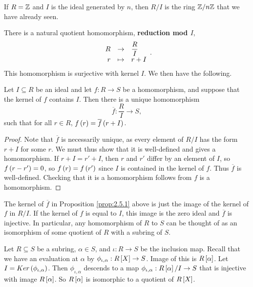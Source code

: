 \begin{example*}
If $ R = \Z $ and $ I $ is the ideal generated by $ n $, then $ R / I $ is the ring $ \Z / n\Z $ that we have already seen.
\end{example*}

There is a natural quotient homomorphism, \textbf{reduction mod $ I $},
$$ \function{R}{\dfrac{R}{I}}{r}{r + I}. $$
This homomorphism is surjective with kernel $ I $. We then have the following.

\begin{proposition}
\label{prop:2.5.1}
Let $ I \subseteq R $ be an ideal and let $ f : R \to S $ be a homomorphism, and suppose that the kernel of $ f $ contains $ I $. Then there is a unique homomorphism
$$ \overline{f} : \dfrac{R}{I} \to S, $$
such that for all $ r \in R $, $ f\rb{r} = \overline{f}\rb{r + I} $.
\end{proposition}

\begin{proof}
Note that $ \overline{f} $ is necessarily unique, as every element of $ R / I $ has the form $ r + I $ for some $ r $. We must thus show that it is well-defined and gives a homomorphism. If $ r + I = r' + I $, then $ r $ and $ r' $ differ by an element of $ I $, so $ f\rb{r - r'} = 0 $, so $ f\rb{r} = f\rb{r'} $ since $ I $ is contained in the kernel of $ f $. Thus $ \overline{f} $ is well-defined. Checking that it is a homomorphism follows from $ f $ is a homomorphism.
\end{proof}

\begin{note*}
The kernel of $ \overline{f} $ in Proposition \ref{prop:2.5.1} above is just the image of the kernel of $ f $ in $ R / I $. If the kernel of $ f $ is equal to $ I $, this image is the zero ideal and $ \overline{f} $ is injective. In particular, any homomorphism of $ R $ to $ S $ can be thought of as an isomorphism of some quotient of $ R $ with a subring of $ S $.
\end{note*}

\begin{example*}
Let $ R \subseteq S $ be a subring, $ \alpha \in S $, and $ \iota : R \to S $ be the inclusion map. Recall that we have an evaluation at $ \alpha $ by $ \phi_{\iota, \alpha} : R\sb{X} \to S $. Image of this is $ R\sb{\alpha} $. Let $ I = Ker\rb{\phi_{\iota, \alpha}} $. Then $ \phi_{\iota, \alpha} $ descends to a map $ \phi_{\iota, \alpha} : R\sb{\alpha} / I \to S $ that is injective with image $ R\sb{\alpha} $. So $ R\sb{\alpha} $ is isomorphic to a quotient of $ R\sb{X} $.
\end{example*}

